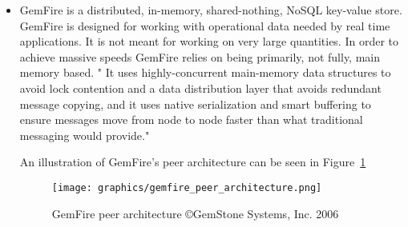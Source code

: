 \documentclass[letterpaper, 12pt]{article}
\begin{document}
\begin{itemize}
  \item GemFire is a distributed, in-memory, shared-nothing, NoSQL key-value store.
  GemFire is designed for working with operational data needed by real time
  applications. It is not meant for working on very large quantities. In order to
  achieve massive speeds GemFire relies on being primarily, not fully,
  main memory based. " It uses highly-concurrent main-memory data structures to avoid
  lock contention and a data distribution
  layer that avoids redundant message copying, and it uses native serialization and
  smart buffering to ensure messages move from node to node faster than what
  traditional messaging would provide."\cite{gemfire}
  \par\vspace{\baselineskip}
  An illustration of GemFire's peer architecture can be seen in Figure~\ref{fig:gemfire_peer}
  \begin{figure}
  	\centering
  	\label{fig:gemfire_peer}
  	\texttt{[image: graphics/gemfire\_peer\_architecture.png]}
  	\caption{GemFire peer architecture \copyright GemStone Systems, Inc. 2006 \cite{gemfire}}
  \end{figure}
  \par\vspace{\baselineskip}


\end{itemize}
\end{document}
